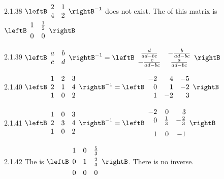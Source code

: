 \begin{Answer}{2.1.38}
$\leftB
\begin{array}{cc}
2 & 1 \\
4 & 2
\end{array}
\rightB^{-1}$ does not exist. The \rref\; of this matrix
is $\leftB
\begin{array}{cc}
1 & \vspace{0.05in}\frac{1}{2} \\
0 & 0
\end{array}
\rightB$
\end{Answer}
\begin{Answer}{2.1.39}
$\leftB
\begin{array}{cc}
a & b \\
c & d
\end{array}
\rightB^{-1}= \leftB
\begin{array}{cc}
\frac{d}{ad-bc} & -\frac{b}{ad-bc} \\
-\frac{c}{ad-bc} & \frac{a}{ad-bc}
\end{array}
\rightB$
\end{Answer}
\begin{Answer}{2.1.40}
$\leftB
\begin{array}{ccc}
1 & 2 & 3 \\
2 & 1 & 4 \\
1 & 0 & 2
\end{array}
\rightB^{-1}= \leftB
\begin{array}{rrr}
-2 & 4 & -5 \\
0 & 1 & -2 \\
1 & -2 & 3
\end{array}
\rightB$
\end{Answer}
\begin{Answer}{2.1.41}
$\leftB
\begin{array}{ccc}
1 & 0 & 3 \\
2 & 3 & 4 \\
1 & 0 & 2
\end{array}
\rightB^{-1}= \leftB
\begin{array}{rrr}
-2 & 0 & 3 \\
0 & \vspace{0.05in}\frac{1}{3} & -\vspace{0.05in}\frac{2}{3} \\
1 & 0 & -1
\end{array}
\rightB$
\end{Answer}
\begin{Answer}{2.1.42}
The \rref\; is
$\leftB
\begin{array}{ccc}
1 & 0 & \vspace{0.05in}\frac{5}{3} \\
0 & 1 & \vspace{0.05in}\frac{2}{3} \\
0 & 0 & 0
\end{array}
\rightB$. There is no inverse.
\end{Answer}
